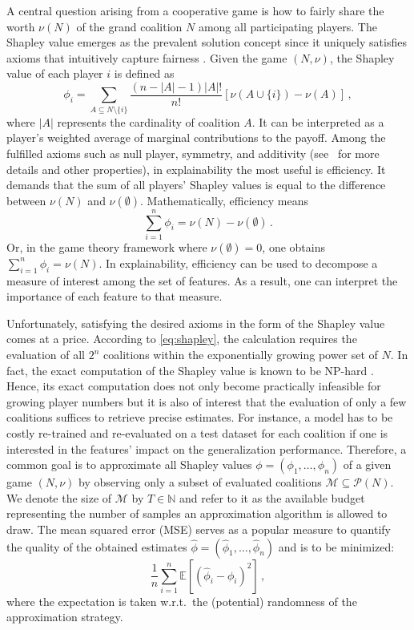 A central question arising from a cooperative game is how to fairly share the worth $\nu(N)$ of the grand coalition $N$ among all participating players.
The Shapley value \citep{Shapley.1953} emerges as the prevalent solution concept since it uniquely satisfies axioms that intuitively capture fairness \citep{Shapley.1953}.
Given the game $(N, \nu)$, the Shapley value of each player $i$ is defined as
\begin{equation}
    \label{eq:shapley}
    \phi_i = \sum\limits_{A \subseteq N \setminus \{i\}} \frac{\left(n - \left| A \right| - 1 \right)\left| A \right|!}{n!} [\nu(A \cup \{i\}) - \nu(A)] \, ,
\end{equation}
where $\left| A \right|$ represents the cardinality of coalition $A$.
It can be interpreted as a player's weighted average of marginal contributions to the payoff.
Among the fulfilled axioms such as null player, symmetry, and additivity (see~\citep{Young1985} for more details and other properties), in explainability the most useful is efficiency.
It demands that the sum of all players' Shapley values is equal to the difference between $\nu(N)$ and $\nu(\emptyset)$.
Mathematically, efficiency means
\begin{equation}
    \label{eq:effic}
    \sum_{i=1}^n \phi_i = \nu(N) - \nu(\emptyset) \, .
\end{equation}
Or, in the game theory framework where $\nu(\emptyset) = 0$, one obtains $\sum_{i=1}^n \phi_i = \nu(N)$.
In explainability, efficiency can be used to decompose a measure of interest among the set of features.
As a result, one can interpret the importance of each feature to that measure.

Unfortunately, satisfying the desired axioms in the form of the Shapley value comes at a price.
According to \cref{eq:shapley}, the calculation requires the evaluation of all $2^n$ coalitions within the exponentially growing power set of $N$.
In fact, the exact computation of the Shapley value is known to be NP-hard \citep{Deng.1994}.
Hence, its exact computation does not only become practically infeasible for growing player numbers but it is also of interest that the evaluation of only a few coalitions suffices to retrieve precise estimates.
For instance, a model has to be costly re-trained and re-evaluated on a test dataset for each coalition if one is interested in the features' impact on the generalization performance.
Therefore, a common goal is to approximate all Shapley values $\phi = (\phi_1,\ldots,\phi_n)$ of a given game $(N,\nu)$ by observing only a subset of evaluated coalitions $ \mathcal{M} \subseteq \mathcal{P}(N)$.
We denote the size of $\mathcal{M}$ by $T \in \mathbb{N}$ and refer to it as the available budget representing the number of samples an approximation algorithm is allowed to draw.
The mean squared error (MSE) serves as a popular measure to quantify the quality of the obtained estimates $\hat\phi = (\hat\phi_1,\ldots,\hat\phi_n)$ and is to be minimized:
\begin{equation}
    \label{eq:mse}
     \frac{1}{n} \sum\limits_{i=1}^n \mathbb{E} \left[ \left( \hat\phi_i - \phi_i \right)^2 \right] \, ,
\end{equation}
where the expectation is taken w.r.t.\ the (potential) randomness of the approximation strategy.

